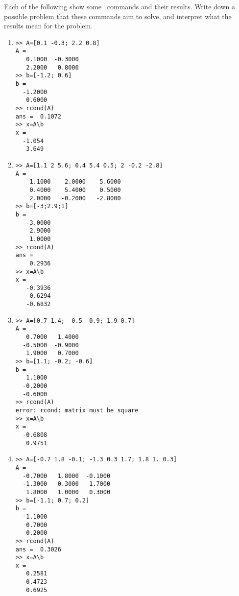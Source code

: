 \begin{exercise} \label{ex:} 
Each of the following show some \script\ commands and their results.
Write down a possible problem that these commands aim to solve, and interpret what the results mean for the problem.
\begin{enumerate}
\item
\begin{verbatim}
>> A=[0.1 -0.3; 2.2 0.8]
A =
   0.1000  -0.3000
   2.2000   0.8000
>> b=[-1.2; 0.6]
b =
  -1.2000
   0.6000
>> rcond(A)
ans =  0.1072
>> x=A\b
x =
  -1.054
   3.649
\end{verbatim}

\item 
\begin{verbatim}
>> A=[1.1 2 5.6; 0.4 5.4 0.5; 2 -0.2 -2.8]
A =
    1.1000    2.0000    5.6000
    0.4000    5.4000    0.5000
    2.0000   -0.2000   -2.8000
>> b=[-3;2.9;1]
b =
   -3.0000
    2.9000
    1.0000
>> rcond(A)
ans =
    0.2936
>> x=A\b
x =
   -0.3936
    0.6294
   -0.6832
\end{verbatim}


\item
\begin{verbatim}
>> A=[0.7 1.4; -0.5 -0.9; 1.9 0.7]
A =
   0.7000   1.4000
  -0.5000  -0.9000
   1.9000   0.7000
>> b=[1.1; -0.2; -0.6]
b =
   1.1000
  -0.2000
  -0.6000
>> rcond(A)
error: rcond: matrix must be square
>> x=A\b
x =
  -0.6808
   0.9751
\end{verbatim}

\item
\begin{verbatim}
>> A=[-0.7 1.8 -0.1; -1.3 0.3 1.7; 1.8 1. 0.3]
A =
  -0.7000   1.8000  -0.1000
  -1.3000   0.3000   1.7000
   1.8000   1.0000   0.3000
>> b=[-1.1; 0.7; 0.2]
b =
  -1.1000
   0.7000
   0.2000
>> rcond(A)
ans =  0.3026
>> x=A\b
x =
   0.2581
  -0.4723
   0.6925
\end{verbatim}



\end{enumerate}
\end{exercise}
